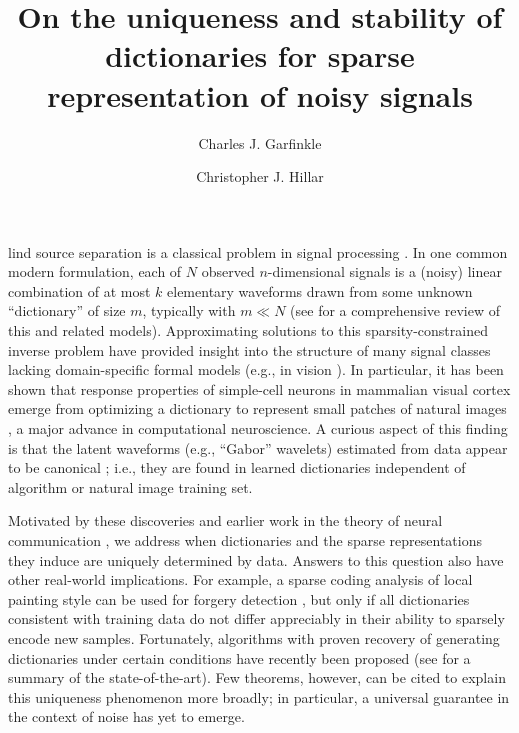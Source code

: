 \documentclass[9pt,twocolumn]{pnas-new}
\title{On the uniqueness and stability of dictionaries for sparse representation of noisy signals}
\author[a,b, 1]{Charles J. Garfinkle}
\author[a,1]{Christopher J. Hillar}
\affil[a]{Redwood Center for Theoretical Neuroscience, Berkeley, CA, USA}
\affil[b]{Helen Wills Neuroscience Institute, UC Berkeley}
\begin{document}
\verticaladjustment{-2pt}

\maketitle
\thispagestyle{firststyle}

lind source separation is a classical problem in signal processing \cite{sato1975method}.
In one common modern formulation, each of $N$ observed $n$-dimensional signals is a (noisy) linear combination of at most $k$ elementary waveforms drawn from some unknown ``dictionary'' of size $m$, typically with $m \ll N$ (see \cite{Zhang15} for a comprehensive review of this and related models).
Approximating solutions to this sparsity-constrained inverse problem have provided insight into the structure of many signal classes lacking domain-specific formal models (e.g., in vision \cite{wang2015sparse}).  In particular, it has been shown that response properties of simple-cell neurons in mammalian visual cortex emerge from optimizing a dictionary to represent small patches of natural images \cite{Olshausen96, hurri1996image, bell1997independent, van1998independent}, a major advance in computational neuroscience. A curious aspect of this finding is that the latent waveforms (e.g., ``Gabor'' wavelets) estimated from data appear to be canonical \cite{donoho2001can};
i.e., they are found in learned dictionaries independent of algorithm or natural image training set.

Motivated by these discoveries and earlier work in the theory of neural communication \cite{Isely10}, we address when dictionaries and the sparse representations they induce are uniquely determined by data.  Answers to this question also have other real-world implications.  For example, a sparse coding analysis of local painting style can be used for forgery detection \cite{hughes2010, Olshausen10}, but only if all dictionaries consistent with training data do not differ appreciably in their ability to sparsely encode new samples. 
Fortunately, algorithms with proven recovery of generating dictionaries under certain 
conditions have recently been proposed (see \cite[Sec.~I-E]{Sun16} for a summary of the state-of-the-art). Few theorems, however, can be cited to explain this uniqueness phenomenon more broadly; in particular, a universal guarantee in the context of noise has yet to emerge.
\end{document}
